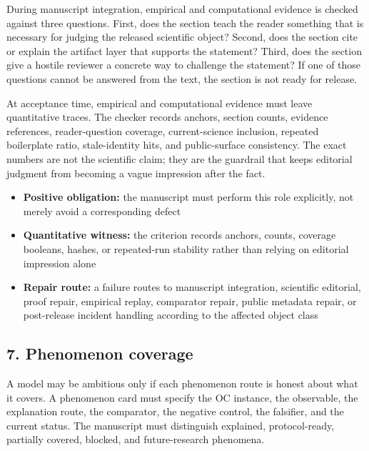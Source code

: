 During manuscript integration, empirical and computational evidence is checked against three questions. First, does the section teach the reader something that is necessary for judging the released scientific object? Second, does the section cite or explain the artifact layer that supports the statement? Third, does the section give a hostile reviewer a concrete way to challenge the statement? If one of those questions cannot be answered from the text, the section is not ready for release.


At acceptance time, empirical and computational evidence must leave quantitative traces. The checker records anchors, section counts, evidence references, reader-question coverage, current-science inclusion, repeated boilerplate ratio, stale-identity hits, and public-surface consistency. The exact numbers are not the scientific claim; they are the guardrail that keeps editorial judgment from becoming a vague impression after the fact.


\begin{itemize}[leftmargin=1.8em]

\item \textbf{Positive obligation:} the manuscript must perform this role explicitly, not merely avoid a corresponding defect

\item \textbf{Quantitative witness:} the criterion records anchors, counts, coverage booleans, hashes, or repeated-run stability rather than relying on editorial impression alone

\item \textbf{Repair route:} a failure routes to manuscript integration, scientific editorial, proof repair, empirical replay, comparator repair, public metadata repair, or post-release incident handling according to the affected object class

\end{itemize}

\subsection{7. Phenomenon coverage}

A model may be ambitious only if each phenomenon route is honest about what it covers. A phenomenon card must specify the OC instance, the observable, the explanation route, the comparator, the negative control, the falsifier, and the current status. The manuscript must distinguish explained, protocol-ready, partially covered, blocked, and future-research phenomena.



